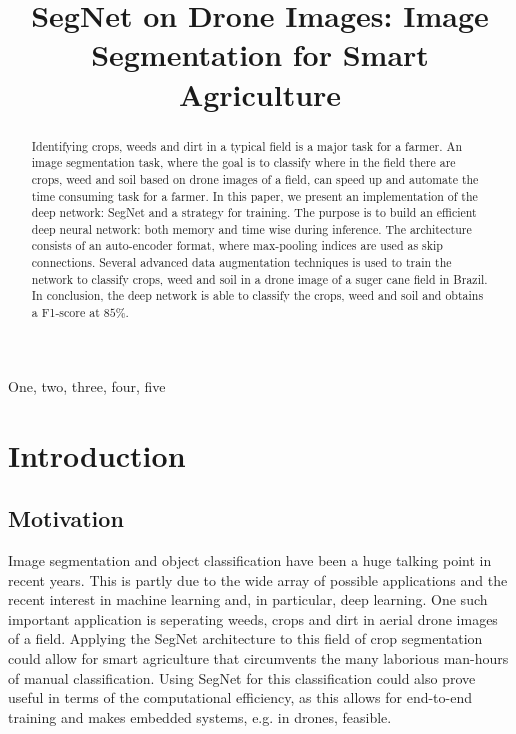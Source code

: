 \documentclass{article}
\title{SegNet on Drone Images: Image Segmentation for Smart Agriculture}
\begin{document}
%

\maketitle
%
\begin{abstract}
 Identifying crops, weeds and dirt in a typical field is a major task for a farmer. An image segmentation task, where the goal is to classify where in the field there are crops, weed and soil based on drone images of a field, can speed up and automate the time consuming task for a farmer. In this paper, we present an implementation of the deep network: SegNet and a strategy for training. The purpose is to build an efficient deep neural network: both memory and time wise during inference. The architecture consists of an auto-encoder format, where max-pooling indices are used as skip connections. Several advanced data augmentation techniques is used to train the network to classify crops, weed and soil in a drone image of a suger cane field in Brazil. In conclusion, the deep network is able to classify the crops, weed and soil and obtains a F1-score at $ 85 \% $. 
\end{abstract}
%
\begin{keywords}
One, two, three, four, five
\end{keywords}
%
\section{Introduction}
\label{sec:intro}

\subsection{Motivation}
Image segmentation and object classification have been a huge talking point in recent years. This is partly due to the wide array of possible applications and the recent interest in machine learning and, in particular, deep learning. One such important application is seperating weeds, crops and dirt in aerial drone images of a field. Applying the SegNet architecture to this field of crop segmentation could allow for smart agriculture that circumvents the many laborious man-hours of manual classification. Using SegNet for this classification could also prove useful in terms of the computational efficiency, as this allows for end-to-end training and makes embedded systems, e.g. in drones, feasible.
\end{document}
